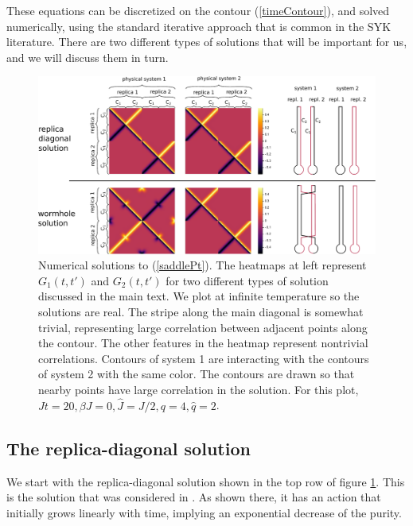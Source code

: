 \documentclass[11pt]{article}
\numberwithin{equation}{section}
\begin{document}
These equations can be discretized on the contour (\ref{timeContour}), and solved numerically, using the standard iterative approach that is common in the SYK literature. There are two different types of solutions that will be important for us, and we will discuss them in turn. 



	\begin{figure}[t]
\begin{center}
\includegraphics[width = \textwidth]{images/heatmapCombined.pdf}
\caption{{\small Numerical solutions to (\ref{saddlePt}). The heatmaps at left represent $G_1(t,t')$ and $G_2(t,t')$ for two different types of solution discussed in the main text. We plot at infinite temperature so the solutions are real. The stripe along the main diagonal is somewhat trivial, representing large correlation between adjacent points along the contour. The other features in the heatmap represent nontrivial correlations. Contours of system 1 are interacting with the contours of system 2 with the same color. The contours are drawn so that nearby points have large correlation in the solution. For this plot, $Jt = 20, \beta J = 0, \hat{J} = J/2, q = 4, \hat{q} = 2$.}}\label{figheatmap}
\end{center}
\end{figure}

\subsection{The replica-diagonal solution}
We start with the replica-diagonal solution shown in the top row of figure \ref{figheatmap}. This is the solution that was considered in \cite{Gu:2017njx}. As shown there, it has an action that initially grows linearly with time, implying an exponential decrease of the purity. 
\end{document}
